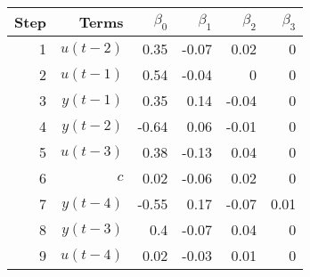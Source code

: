 \begin{tabular}{rrrrrr}
Step & Terms & $\beta_{0}$ & $\beta_{1}$ & $\beta_{2}$ & $\beta_{3}$ \\ 
\hline 
1 & $u(t-2)$ & 0.35 & -0.07 & 0.02 & 0 \\ 
2 & $u(t-1)$ & 0.54 & -0.04 & 0 & 0 \\ 
3 & $y(t-1)$ & 0.35 & 0.14 & -0.04 & 0 \\ 
4 & $y(t-2)$ & -0.64 & 0.06 & -0.01 & 0 \\ 
5 & $u(t-3)$ & 0.38 & -0.13 & 0.04 & 0 \\ 
6 & $c$ & 0.02 & -0.06 & 0.02 & 0 \\ 
7 & $y(t-4)$ & -0.55 & 0.17 & -0.07 & 0.01 \\ 
8 & $y(t-3)$ & 0.4 & -0.07 & 0.04 & 0 \\ 
9 & $u(t-4)$ & 0.02 & -0.03 & 0.01 & 0 \\ 
\hline 
\end{tabular}